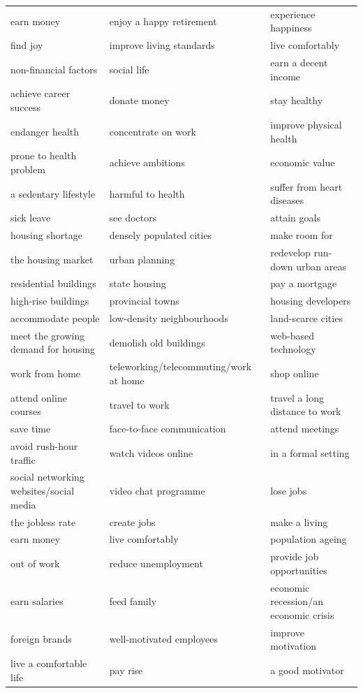 \documentclass[10pt,a4paper]{article}
\begin{document}
{\begin{longtable}{@{}*{3}{p{}}@{}}
earn money & enjoy a happy retirement & experience happiness \\
find joy & improve living standards & live comfortably \\
non-financial factors & social life & earn a decent income \\
achieve career success & donate money & stay healthy \\
endanger health & concentrate on work & improve physical health \\
prone to health problem & achieve ambitions & economic value \\
a sedentary lifestyle & harmful to health & suffer from heart diseases \\
sick leave & see doctors & attain goals \\
housing shortage & densely populated cities & make room for \\
the housing market & urban planning & redevelop run-down urban areas \\
residential buildings & state housing & pay a mortgage \\
high-rise buildings & provincial towns & housing developers \\
accommodate people & low-density neighbourhoods & land-scarce cities \\
meet the growing demand for housing & demolish old buildings & web-based technology \\
work from home & teleworking/telecommuting/work at home & shop online \\
attend online courses & travel to work & travel a long distance to work \\
save time & face-to-face communication & attend meetings \\
avoid rush-hour traffic & watch videos online & in a formal setting \\
social networking websites/social media & video chat programme & lose jobs \\
the jobless rate & create jobs & make a living \\
earn money & live comfortably & population ageing \\
out of work & reduce unemployment & provide job opportunities \\
earn salaries & feed family & economic recession/an economic crisis \\
foreign brands & well-motivated employees & improve motivation \\
live a comfortable life & pay rise & a good motivator \\

\end{longtable}}
\end{document}
